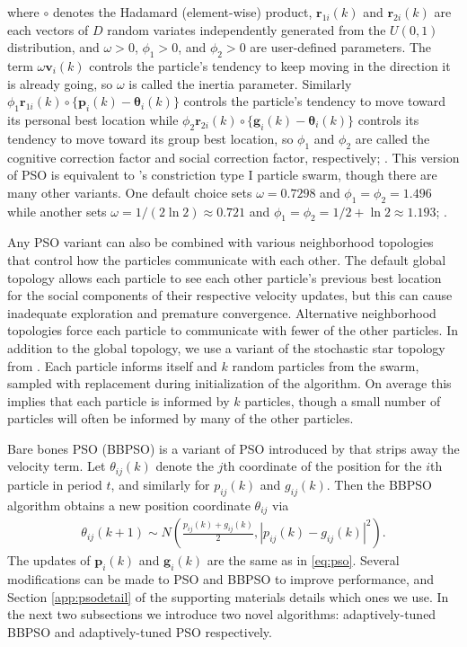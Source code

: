 \documentclass[cmbright]{staauth}
\begin{document}
where $\circ$ denotes the Hadamard (element-wise) product, $\bm{r}_{1i}(k)$ and $\bm{r}_{2i}(k)$ are each vectors of $D$ random variates independently generated from the $U(0,1)$ distribution, and $\omega>0$, $\phi_1>0$, and $\phi_2>0$ are user-defined parameters. The term $\omega \bm{v}_i(k)$ controls the particle's tendency to keep moving in the direction it is already going, so $\omega$ is called the inertia parameter. Similarly $\phi_1 \bm{r}_{1i}(k)\circ\{\bm{p}_i(k) - \bm{\theta}_i(k)\}$ controls the particle's tendency to move toward its personal best location while $\phi_2 \bm{r}_{2i}(k)\circ\{\bm{g}_i(k) - \bm{\theta}_i(k)\}$ controls its tendency to move toward its group best location, so $\phi_1$ and $\phi_2$ are called the cognitive correction factor and social correction factor, respectively; \cite{blum2008swarm}. This version of PSO is equivalent to \cite{clerc2002particle}'s constriction type I particle swarm, though there are many other variants. One default choice sets $\omega = 0.7298$ and $\phi_1 = \phi_2 = 1.496$ while another sets $\omega = 1/(2\ln 2)\approx 0.721$ and $\phi_1=\phi_2=1/2 + \ln 2\approx 1.193$; \cite{clerc2002particle,clerc2006stagnation}.

Any PSO variant can also be combined with various neighborhood topologies that control how the particles communicate with each other. The default global topology allows each particle to see each other particle's previous best location for the social components of their respective velocity updates, but this can cause inadequate exploration and premature convergence. Alternative neighborhood topologies force each particle to communicate with fewer of the other particles. In addition to the global topology, we use a variant of the stochastic star topology from \cite{miranda2008stochastic}. Each particle informs itself and $k$ random particles from the swarm, sampled with replacement during initialization of the algorithm. On average this implies that each particle is informed by $k$ particles, though a small number of particles will often be informed by many of the other particles.

Bare bones PSO (BBPSO) is a variant of PSO introduced by \cite{kennedy2003bare} that strips away the velocity term. Let $\theta_{ij}(k)$ denote the $j$th coordinate of the position for the $i$th particle in period $t$, and similarly for $p_{ij}(k)$ and $g_{ij}(k)$. Then the BBPSO algorithm obtains a new position coordinate $\theta_{ij}$ via
\begin{align}\label{eq:bbpso}
\theta_{ij}(k+1) \sim N\left(\frac{p_{ij}(k) + g_{ij}(k)}{2}, |p_{ij}(k) - g_{ij}(k)|^2\right).
\end{align}
The updates of $\bm{p}_i(k)$ and $\bm{g}_i(k)$ are the same as in \eqref{eq:pso}. Several modifications can be made to PSO and BBPSO to improve performance, and Section \ref{app:psodetail} of the supporting materials details which ones we use. In the next two subsections we introduce two novel algorithms: adaptively-tuned BBPSO and adaptively-tuned PSO respectively.
\end{document}
